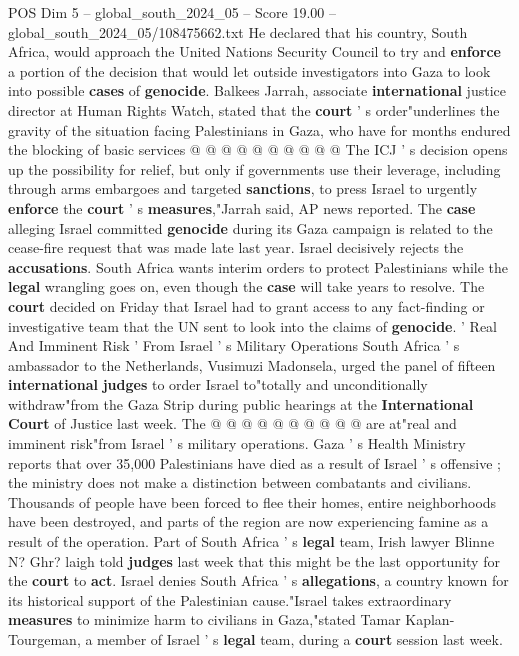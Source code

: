 \begin{textsample}{POS Dim 5 – global\_south\_2024\_05 – Score 19.00 – global\_south\_2024\_05/108475662.txt}
He declared that his country, South Africa, would approach the United Nations Security Council to try and \textbf{enforce} a portion of the decision that would let outside investigators into Gaza to look into possible \textbf{cases} of \textbf{genocide}.
Balkees Jarrah, associate \textbf{international} justice director at Human Rights Watch, stated that the \textbf{court} ' s order"underlines the gravity of the situation facing Palestinians in Gaza, who have for months endured the blocking of basic services @ @ @ @ @ @ @ @ @ @ The ICJ ' s decision opens up the possibility for relief, but only if governments use their leverage, including through arms embargoes and targeted \textbf{sanctions}, to press Israel to urgently \textbf{enforce} the \textbf{court} ' s \textbf{measures},"Jarrah said, AP news reported.
The \textbf{case} alleging Israel committed \textbf{genocide} during its Gaza campaign is related to the cease-fire request that was made late last year.
Israel decisively rejects the \textbf{accusations}.
South Africa wants interim orders to protect Palestinians while the \textbf{legal} wrangling goes on, even though the \textbf{case} will take years to resolve.
The \textbf{court} decided on Friday that Israel had to grant access to any fact-finding or investigative team that the UN sent to look into the claims of \textbf{genocide}. ' Real And Imminent Risk ' From Israel ' s Military Operations South Africa ' s ambassador to the Netherlands, Vusimuzi Madonsela, urged the panel of fifteen \textbf{international} \textbf{judges} to order Israel to"totally and unconditionally withdraw"from the Gaza Strip during public hearings at the \textbf{International} \textbf{Court} of Justice last week.
The @ @ @ @ @ @ @ @ @ @ are at"real and imminent risk"from Israel ' s military operations.
Gaza ' s Health Ministry reports that over 35,000 Palestinians have died as a result of Israel ' s offensive ; the ministry does not make a distinction between combatants and civilians.
Thousands of people have been forced to flee their homes, entire neighborhoods have been destroyed, and parts of the region are now experiencing famine as a result of the operation.
Part of South Africa ' s \textbf{legal} team, Irish lawyer Blinne N?
Ghr? laigh told \textbf{judges} last week that this might be the last opportunity for the \textbf{court} to \textbf{act}.
Israel denies South Africa ' s \textbf{allegations}, a country known for its historical support of the Palestinian cause."Israel takes extraordinary \textbf{measures} to minimize harm to civilians in Gaza,"stated Tamar Kaplan-Tourgeman, a member of Israel ' s \textbf{legal} team, during a \textbf{court} session last week.

\end{textsample}
